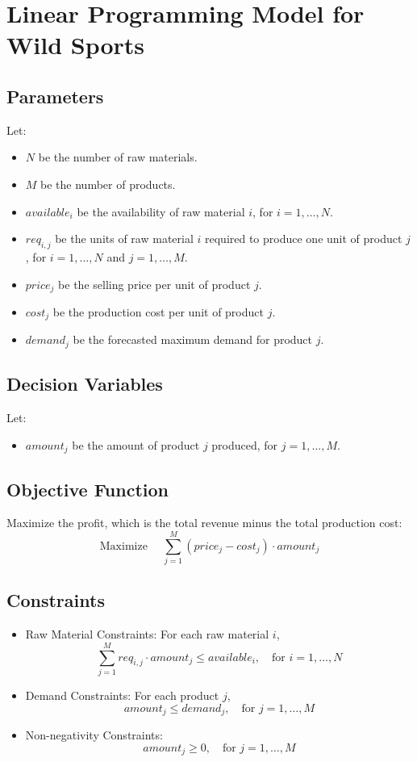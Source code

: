 \documentclass{article}
\begin{document}
\section*{Linear Programming Model for Wild Sports}

\subsection*{Parameters}
Let:
\begin{itemize}
    \item $N$ be the number of raw materials.
    \item $M$ be the number of products.
    \item $available_i$ be the availability of raw material $i$, for $i = 1, \ldots, N$.
    \item $req_{i,j}$ be the units of raw material $i$ required to produce one unit of product $j$, for $i = 1, \ldots, N$ and $j = 1, \ldots, M$.
    \item $price_j$ be the selling price per unit of product $j$.
    \item $cost_j$ be the production cost per unit of product $j$.
    \item $demand_j$ be the forecasted maximum demand for product $j$.
\end{itemize}

\subsection*{Decision Variables}
Let:
\begin{itemize}
    \item $amount_j$ be the amount of product $j$ produced, for $j = 1, \ldots, M$.
\end{itemize}

\subsection*{Objective Function}
Maximize the profit, which is the total revenue minus the total production cost:
\[
\text{Maximize } \quad \sum_{j=1}^{M} (price_j - cost_j) \cdot amount_j
\]

\subsection*{Constraints}
\begin{itemize}
    \item Raw Material Constraints: For each raw material $i$,
    \[
    \sum_{j=1}^{M} req_{i,j} \cdot amount_j \leq available_i, \quad \text{for } i = 1, \ldots, N
    \]
    \item Demand Constraints: For each product $j$,
    \[
    amount_j \leq demand_j, \quad \text{for } j = 1, \ldots, M
    \]
    \item Non-negativity Constraints:
    \[
    amount_j \geq 0, \quad \text{for } j = 1, \ldots, M
    \]
\end{itemize}
\end{document}
